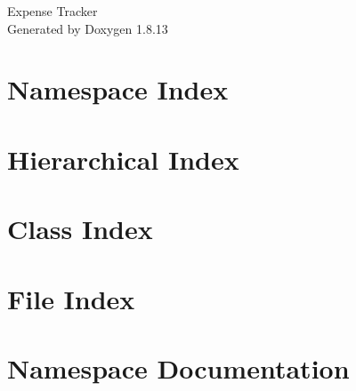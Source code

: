 \documentclass[twoside]{book}
\newcommand{\+}{\discretionary{\mbox{\scriptsize$\hookleftarrow$}}{}{}}
\newcommand{\clearemptydoublepage}{%
  \newpage{\pagestyle{empty}\cleardoublepage}%
}
\begin{document}
\hypersetup{pageanchor=false,
             bookmarksnumbered=true,
             pdfencoding=unicode
            }
\begin{titlepage}
\vspace*{7cm}
\begin{center}%
{\Large Expense Tracker }\\
\vspace*{1cm}
{\large Generated by Doxygen 1.8.13}\\
\end{center}
\end{titlepage}
\clearemptydoublepage
{}
\tableofcontents
\clearemptydoublepage
{}
\hypersetup{pageanchor=true}

\chapter{Namespace Index}

\chapter{Hierarchical Index}

\chapter{Class Index}

\chapter{File Index}

\chapter{Namespace Documentation}







\end{document}
